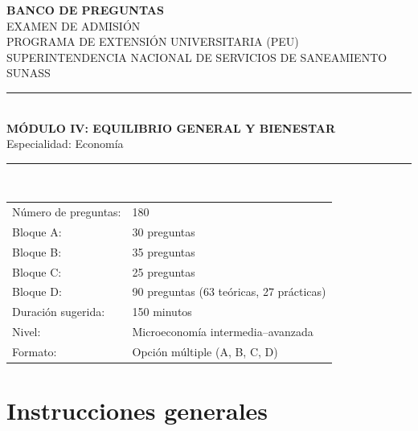 \documentclass[11pt,a4paper]{article}
\begin{document}
\begin{titlepage}
\thispagestyle{empty}
\centering
\backboneportadaheader

{\Large\bfseries BANCO DE PREGUNTAS}\\[0.35cm]
{\large EXAMEN DE ADMISIÓN}\\[0.15cm]
{\large PROGRAMA DE EXTENSIÓN UNIVERSITARIA (PEU)}\\[0.15cm]
{\large SUPERINTENDENCIA NACIONAL DE SERVICIOS DE SANEAMIENTO}\\[0.05cm]
{\large SUNASS}\\[1.0cm]

\rule{\linewidth}{0.9pt}\\[0.55cm]
{\LARGE\bfseries MÓDULO IV: EQUILIBRIO GENERAL Y BIENESTAR}\\[0.35cm]
{\large Especialidad: Economía}\\[0.55cm]
\rule{\linewidth}{0.9pt}\\[1.0cm]

\begin{tabular}{ll}
\toprule
Número de preguntas: & 180 \\
Bloque A: & 30 preguntas \\
Bloque B: & 35 preguntas \\
Bloque C: & 25 preguntas \\
Bloque D: & 90 preguntas (63 teóricas, 27 prácticas) \\
Duración sugerida: & 150 minutos \\
Nivel: & Microeconomía intermedia--avanzada \\
Formato: & Opción múltiple (A, B, C, D) \\
\bottomrule
\end{tabular}

\vfill
\backboneportadafooter
\end{titlepage}

\section*{Instrucciones generales}
\end{document}
